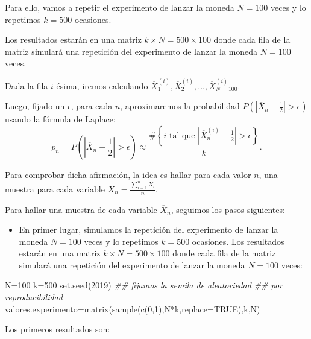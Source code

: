 \documentclass[
  letterpaper,
  DIV=11,
  numbers=noendperiod]{scrreprt}
\newenvironment{Shaded}{\begin{snugshade}}{\end{snugshade}}
\newcommand{\AttributeTok}[1]{\textcolor[rgb]{0.40,0.45,0.13}{#1}}
\newcommand{\ConstantTok}[1]{\textcolor[rgb]{0.56,0.35,0.01}{#1}}
\newcommand{\DecValTok}[1]{\textcolor[rgb]{0.68,0.00,0.00}{#1}}
\newcommand{\DocumentationTok}[1]{\textcolor[rgb]{0.37,0.37,0.37}{\textit{#1}}}
\newcommand{\FunctionTok}[1]{\textcolor[rgb]{0.28,0.35,0.67}{#1}}
\newcommand{\NormalTok}[1]{\textcolor[rgb]{0.00,0.23,0.31}{#1}}
\newcommand{\OtherTok}[1]{\textcolor[rgb]{0.00,0.23,0.31}{#1}}
\newcommand{\SpecialCharTok}[1]{\textcolor[rgb]{0.37,0.37,0.37}{#1}}
\providecommand{\tightlist}{%
  \setlength{\itemsep}{0pt}\setlength{\parskip}{0pt}}\usepackage{longtable,booktabs,array}
\begin{document}
Para ello, vamos a repetir el experimento de lanzar la moneda \(N=100\)
veces y lo repetimos \(k=500\) ocasiones.

Los resultados estarán en una matriz \(k\times N =500\times 100\) donde
cada fila de la matriz simulará una repetición del experimento de lanzar
la moneda \(N=100\) veces.

Dada la fila \(i\)-ésima, iremos calculando
\(\overline{X}_1^{(i)},\overline{X}_2^{(i)},\ldots,\overline{X}_{N=100}^{(i)}\).

Luego, fijado un \(\epsilon\), para cada \(n\), aproximaremos la
probabilidad
\(P\left(\left|\overline{X}_n-\frac{1}{2}\right|>\epsilon\right)\)
usando la fórmula de Laplace: \[
p_n=P\left(\left|\overline{X}_n-\frac{1}{2}\right|>\epsilon\right) \approx\frac{\#\left\{\mbox{$i$ tal que  $\left|\overline{X}_n^{(i)}-\frac{1}{2}\right|>\epsilon$}\right\}}{k}.
\]

Para comprobar dicha afirmación, la idea es hallar para cada valor
\(n\), una muestra para cada variable
\(\overline{X}_n=\frac{\sum\limits_{i=1}^n X_i}{n}\).

Para hallar una muestra de cada variable \(\overline{X}_n\), seguimos
los pasos siguientes:

\begin{itemize}
\tightlist
\item
  En primer lugar, simulamos la repetición del experimento de lanzar la
  moneda \(N=100\) veces y lo repetimos \(k=500\) ocasiones. Los
  resultados estarán en una matriz \(k\times N =500\times 100\) donde
  cada fila de la matriz simulará una repetición del experimento de
  lanzar la moneda \(N=100\) veces:
\end{itemize}

\begin{Shaded}
\begin{Highlighting}[]
\NormalTok{N}\OtherTok{=}\DecValTok{100}
\NormalTok{k}\OtherTok{=}\DecValTok{500}
\FunctionTok{set.seed}\NormalTok{(}\DecValTok{2019}\NormalTok{) }
\DocumentationTok{\#\# fijamos la semila de aleatoriedad}
\DocumentationTok{\#\# por reproducibilidad}
\NormalTok{valores.experimento}\OtherTok{=}\FunctionTok{matrix}\NormalTok{(}\FunctionTok{sample}\NormalTok{(}\FunctionTok{c}\NormalTok{(}\DecValTok{0}\NormalTok{,}\DecValTok{1}\NormalTok{),N}\SpecialCharTok{*}\NormalTok{k,}\AttributeTok{replace=}\ConstantTok{TRUE}\NormalTok{),k,N)}
\end{Highlighting}
\end{Shaded}

Los primeros resultados son:
\end{document}

